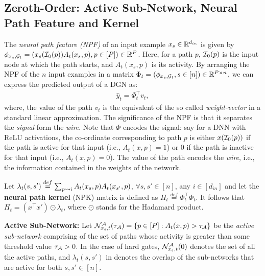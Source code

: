 \subsection{Zeroth-Order: Active Sub-Network, Neural Path Feature and Kernel}
The \emph{neural path feature (NPF)} of an input example $x_s\in \mathbb{R}^{d_{in}}$ is given by $\phi_{x_s,\mathcal{G}_t}=(x_s(\mathcal{I}_0(p))A_t(x_s,p) ,p\in[P])\in\mathbb{R}^P$. Here, for a path $p$, $\mathcal{I}_0(p)$ is the input node at which the path starts, and $A_t(x_s,p)$ is its activity. By arranging the NPF of the $n$ input examples in a matrix $\Phi_t=(\phi_{x_s,\mathcal{G}_t},s\in[n])\in\mathbb{R}^{P\times n}$, we can express the predicted output of a DGN as: 
\begin{align}\label{eq:npfbasic}
\hat{y}_t=\Phi_t^\top v_t,
\end{align}
where, the value of the path $v_t$ is the equivalent of the so called \emph{weight-vector} in a standard linear approximation. 
The significance of the NPF is that it separates the \emph{signal} form the \emph{wire}. Note that $\Phi$ encodes the signal: say for a DNN with ReLU activations, the co-ordinate corresponding to path $p$ is either $x(\mathcal{I}_0(p))$ if the path is active for that input (i.e., $A_t(x,p)=1$) or $0$ if the path is inactive for that input  (i.e., $A_t(x,p)=0$). The value of the path encodes the \emph{wire}, i.e., the information contained in the weights of the network.
\begin{lemma}\label{lm:npk}
Let $\lambda_t(s,s')\stackrel{def}{=}\sum_{p\rightsquigarrow i} A_t(x_s,p) A_t(x_{s'},p)$, $\forall s,s'\in[n]$, any $i\in [d_{in}]$ and let the \textbf{neural path kernel} (NPK) matrix is defined as $H_t\stackrel{def}=\Phi^\top_t\Phi_t$. It follows that $H_t= (x^\top x')\odot\lambda_t$, where $\odot$ stands for the Hadamard product.
\end{lemma}
\textbf{Active Sub-Network:} Let $\mathcal{N}^{\mathcal{A}}_{x_s,t}(\tau_{\mathcal{A}})=\{p\in[P]:A_t(x,p)>\tau_{\mathcal{A}}\}$ be the \emph{active sub-network} comprising of the set of paths whose activity is greater than some threshold value $\tau_{\mathcal{A}}>0$. In the case of hard gates, $\mathcal{N}^{\mathcal{A}}_{x_s,t}(0)$ denotes the set of all the active paths, and $\lambda_t(s,s')$ in  denotes the overlap of the sub-networks that are active for both $s,s'\in[n]$.\\
